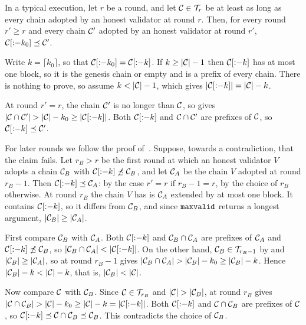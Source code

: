 \begin{lemma}\label{lem.persist}
    In a typical execution, let $r$ be a round, and let $\mathcal{C}\in\mathcal{T}_r$ be at
    least as long as every chain adopted by an honest validator at round $r$.
    Then, for every round $r'\ge r$ and every chain $\mathcal{C}'$ adopted by an
    honest validator at round $r'$, $\mathcal{C}[{:}{-}k_0]\preceq\mathcal{C}'$.
\end{lemma}

\begin{proofof}{}
    Write $k=\lceil k_0\rceil$, so that $\mathcal{C}[{:}{-}k_0]=\mathcal{C}[{:}{-}k]$. If
    $k\ge\lvert \mathcal{C}\rvert-1$ then $\mathcal{C}[{:}{-}k]$ has at most one block, so it is the
    genesis chain or empty and is a prefix of every chain. There is nothing to
    prove, so assume $k<\lvert \mathcal{C}\rvert-1$, which gives
    $\lvert \mathcal{C}[{:}{-}k]\rvert=\lvert \mathcal{C}\rvert-k$.

    At round $r'=r$, the chain $\mathcal{C}'$ is no longer than $\mathcal{C}$, so
     gives
    $\lvert \mathcal{C}\cap\mathcal{C}'\rvert>\lvert \mathcal{C}\rvert-k_0\ge\lvert \mathcal{C}[{:}{-}k]\rvert$. Both
    $\mathcal{C}[{:}{-}k]$ and $\mathcal{C}\cap\mathcal{C}'$ are prefixes of $\mathcal{C}$, so
    $\mathcal{C}[{:}{-}k]\preceq\mathcal{C}'$.

    For later rounds we follow the proof of~\cite[Theorem 4.10]{gkl24}.
    Suppose, towards a contradiction, that the claim fails. Let $r_B>r$ be the first round at which an honest validator
    $V$ adopts a chain $\mathcal{C}_B$ with $\mathcal{C}[{:}{-}k]\not\preceq\mathcal{C}_B$, and let
    $\mathcal{C}_A$ be the chain $V$ adopted at round $r_B-1$. Then
    $\mathcal{C}[{:}{-}k]\preceq\mathcal{C}_A$: by the case $r'=r$ if $r_B-1=r$, by the choice
    of $r_B$ otherwise. At round $r_B$ the chain $V$ has is $\mathcal{C}_A$ extended by at
    most one block. It contains $\mathcal{C}[{:}{-}k]$, so it differs from $\mathcal{C}_B$,
    and since $\mathtt{maxvalid}$ returns a longest argument,
    $\lvert \mathcal{C}_B\rvert\ge\lvert \mathcal{C}_A\rvert$.

    First compare $\mathcal{C}_B$ with $\mathcal{C}_A$. Both $\mathcal{C}[{:}{-}k]$ and
    $\mathcal{C}_B\cap\mathcal{C}_A$ are prefixes of $\mathcal{C}_A$ and
    $\mathcal{C}[{:}{-}k]\not\preceq\mathcal{C}_B$, so
    $\lvert \mathcal{C}_B\cap\mathcal{C}_A\rvert<\lvert \mathcal{C}[{:}{-}k]\rvert$. On the other hand,
    $\mathcal{C}_B\in\mathcal{T}_{r_B-1}$ by  and
    $\lvert \mathcal{C}_B\rvert\ge\lvert \mathcal{C}_A\rvert$, so  at round $r_B-1$ gives
    $\lvert \mathcal{C}_B\cap\mathcal{C}_A\rvert>\lvert \mathcal{C}_B\rvert-k_0\ge\lvert \mathcal{C}_B\rvert-k$. Hence
    $\lvert \mathcal{C}_B\rvert-k<\lvert \mathcal{C}\rvert-k$, that is, $\lvert \mathcal{C}_B\rvert<\lvert \mathcal{C}\rvert$.

    Now compare $\mathcal{C}$ with $\mathcal{C}_B$. Since $\mathcal{C}\in\mathcal{T}_{r_B}$ and
    $\lvert \mathcal{C}\rvert>\lvert \mathcal{C}_B\rvert$,  at round $r_B$ gives
    $\lvert \mathcal{C}\cap\mathcal{C}_B\rvert>\lvert \mathcal{C}\rvert-k_0\ge\lvert \mathcal{C}\rvert-k=\lvert \mathcal{C}[{:}{-}k]\rvert$.
    Both $\mathcal{C}[{:}{-}k]$ and $\mathcal{C}\cap\mathcal{C}_B$ are prefixes of $\mathcal{C}$, so
    $\mathcal{C}[{:}{-}k]\preceq\mathcal{C}\cap\mathcal{C}_B\preceq\mathcal{C}_B$. This contradicts the
    choice of $\mathcal{C}_B$.
\end{proofof}

